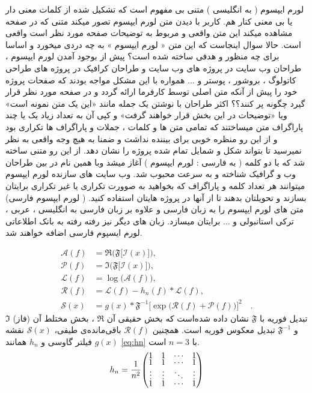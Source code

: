 لورم ایپسوم ( به انگلیسی  ) متنی بی مفهوم است که تشکیل شده از کلمات معنی دار یا بی معنی کنار هم. کاربر با دیدن متن لورم ایپسوم تصور میکند متنی که در صفحه مشاهده میکند این متن واقعی و مربوط به توضیحات صفحه مورد نظر است واقعی است. حالا سوال اینجاست که این متن « لورم ایپسوم » به چه دردی میخورد و اساسا برای چه منظور و هدفی ساخته شده است؟ پیش از بوجود آمدن لورم ایپسوم ، طراحان وب سایت در پروژه های وب سایت و طراحان کرافیک در پروژه های طراحی کاتولوگ ، بروشور ، پوستر و ... همواره با این مشکل مواجه بودند که صفحات پروژه خود را پیش از آنکه متن اصلی توسط کارفرما ارائه گردد و در صفحه مورد نظر قرار گیرد چگونه پر کنند؟؟ اکثر طراحان با نوشتن یک جمله مانند «این یک متن نمونه است» ویا «توضیحات در این بخش قرار خواهند گرفت» و کپی آن به تعداد زیاد یک یا چند پاراگراف متن میساختند که تمامی متن ها و کلمات ، جملات و پاراگراف ها تکراری بود و از این رو منظره خوبی برای بیننده نداشت و ضمنا به هیچ وجه واقعی به نظر نمیرسید تا بتواند شکل و شمایل تمام شده پروژه را نشان دهد. از این رو متنی ساخته شد که با دو کلمه ( به فارسی : لورم ایپسوم ) آغاز میشد وبا همین نام در بین طراحان وب و گرافیک شناخته و به سرعت محبوب شد. وب سایت های سازنده لورم ایپسوم میتوانند هر تعداد کلمه و پاراگراف که بخواهید به صوورت تکراری یا غیر تکراری برایتان بسازند و تحویلتان بدهند تا از آنها در پروژه هایتان استفاده کنید. ( لورم ایپسوم فارسی) متن های لورم ایپسوم را به زبان فارسی و علاوه بر زبان فارسی به انگلیسی ، عربی ، ترکی استانبولی و ... برایتان میسازد. زبان های دیگر نیز رفته رفته به بانک اطلاعاتی لورم ایسپوم فارسی اضافه خواهند شد.  

\begin{equation}
\begin{aligned}
\mathcal{A}(f) & = \mathfrak{R} \Big( \mathfrak{F} \big[ \mathcal{I}(x) \big] \Big), \\
\mathcal{P}(f) & = \mathfrak{I} \Big( \mathfrak{F} \big[ \mathcal{I}(x) \big] \Big), \\
\mathcal{L}(f) & = \log \Big( \mathcal{A}(f) \Big) , \\
\mathcal{R}(f) & =  \mathcal{L}(f) - h_n(f) \ast  \mathcal{L}(f) ,\\
\mathcal{S}(x) & = g(x) \ast \mathfrak{F}^{-1} \Big[ \exp \big(  \mathcal{R}(f) + \mathcal{P}(f) \big) \Big]^{2} \quad . 
\end{aligned}
\end{equation}
تبدیل فوریه با 
$\mathfrak{F}$
نشان داده شده‌است که بخش حقیقی آن 
$\mathfrak{R}$
، بخش مختلط آن (فاز) 
$\mathfrak{I}$
و
$\mathfrak{F}^{-1}$
تبدیل معکوس فوریه است. همچنین 
 $\mathcal{R}(f)$
  باقی‌مانده‌ی طیفی، 
 $\mathcal{S}(x)$
  نقشه‌ 
 $g(x)$
  فیلتر گاوسی و $h_n$ همانند \eqref{eq:hn} با
   $n=3$
    است. 
\begin{equation}
h_n = {{1} \over {n^2} } 
{
\renewcommand\arraystretch{0.5}
 \begin{pmatrix}
    1 & 1 & \cdots & 1  \\
	1 & 1 & \cdots & 1 \\
	 \vdots & \vdots& \ddots & \vdots  \\
	     1 & 1 & \cdots & 1  \\
  \end{pmatrix}
}
\label{eq:hn}
\end{equation}
	
